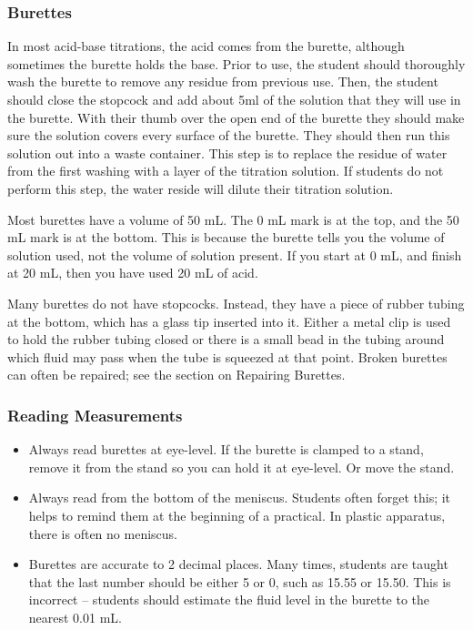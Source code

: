 \subsubsection{Burettes}

In most acid-base titrations, the acid comes from the burette, although sometimes the burette holds the base. Prior to use, the student should thoroughly wash the burette to remove any residue from previous use. Then, the student should close the stopcock and add about 5ml of the solution that they will use in the burette. With their thumb over the open end of the burette they should make sure the solution covers every surface of the burette. They should then run this solution out into a waste container. This step is to replace the residue of water from the first washing with a layer of the titration solution. If students do not perform this step, the water reside will dilute their titration solution.

Most burettes have a volume of 50 mL. The 0 mL mark is at the top, and the 50 mL mark is at the bottom. This is because the burette tells you the volume of solution used, not the volume of solution present. If you start at 0 mL, and finish at 20 mL, then you have used 20 mL of acid.

Many burettes do not have stopcocks. Instead, they have a piece of rubber tubing at the bottom, which has a glass tip inserted into it. Either a metal clip is used to hold the rubber tubing closed or there is a small bead in the tubing around which fluid may pass when the tube is squeezed at that point. Broken burettes can often be repaired; see the section on Repairing Burettes.

\subsubsection{Reading Measurements}

\begin{itemize}

\item{Always read burettes at eye-level. If the burette is clamped to a stand, remove it from the stand so you can hold it at eye-level. Or move the stand.}

\item{Always read from the bottom of the meniscus. Students often forget this; it helps to remind them at the beginning of a practical. In plastic apparatus, there is often no meniscus.}

\item{Burettes are accurate to 2 decimal places. Many times, students are taught that the last number should be either 5 or 0, such as 15.55 or 15.50. This is incorrect – students should estimate the fluid level in the burette to the nearest 0.01 mL.}

\end{itemize}


